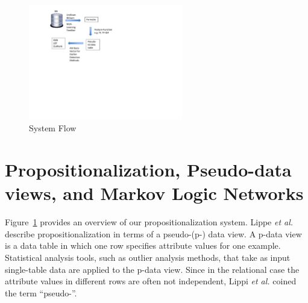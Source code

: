 									\begin{figure}
										\centering
										\includegraphics[width=0.6\textwidth] {figures/OverView.pdf}
										\caption{System Flow
											\label{main:b-chapter3}}
									\end{figure}
									
				
%					
				

\section{Propositionalization, Pseudo-\iid data views, and Markov Logic Networks} Figure~\ref{main:b-chapter3} provides an overview of our propositionalization system. Lippe {\em et al.} \cite{Lippi2011} describe propositionalization in terms of a pseudo-\iid (p-\iid) data view. A p-\iid data view is a data table in which one row specifies attribute values for one example. Statistical analysis tools, such as outlier analysis methods, that take as input single-table data are applied to the p-\iid data view. 
Since in the relational case the attribute values in different rows are often not independent, Lippi {\em et al.} coined the term ``pseudo-\iid''. 

